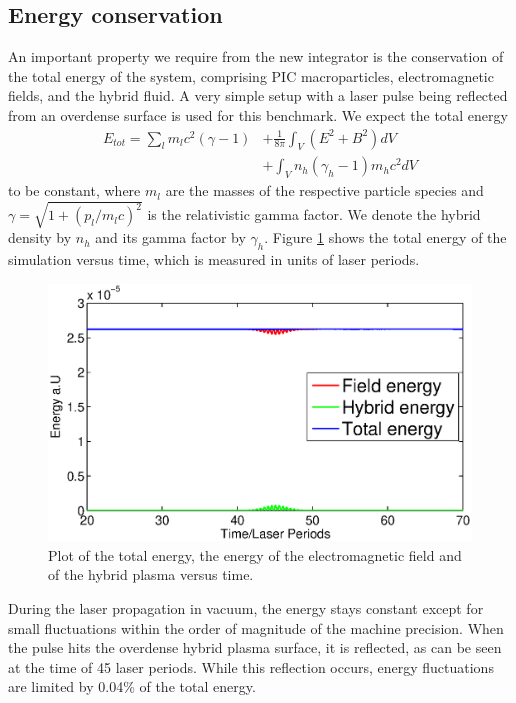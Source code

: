 \documentclass[conference]{IEEEtran}
\renewcommand{\~}{\widetilde }
\begin{document}
\subsection{Energy conservation}
An important property we require from the new integrator is the conservation of the total energy of the system, comprising PIC macroparticles, electromagnetic fields,
and the hybrid fluid. A very simple setup with a laser pulse being reflected from an overdense surface is used for this benchmark. We expect the total energy
\begin{align*}
 E_{tot} =  \sum_l{m_l c^2 (\gamma-1)} &+ \frac{1}{8\pi}\int_V (E^2 + B^2)dV \\
  &+\int_V n_h (\gamma_h -1)m_h c^2 dV
\end{align*}
to be constant, where $m_l$ are the masses of the respective particle species and $\gamma = \sqrt{1 + (p_l/m_lc)^2}$ is the relativistic gamma factor. We denote the hybrid density by $n_h$ and its gamma factor by $\gamma_h$. Figure \ref{energy} shows the total energy of the simulation versus time, which is measured in units of laser periods.
\begin{figure}[H]
	\begin{center}
		\includegraphics[width=1.0\columnwidth]{Energy.eps}
		\caption{Plot of the total energy, the energy of the electromagnetic field and of the hybrid plasma versus time.}
		\label{energy}
	\end{center}
\end{figure}
During the laser propagation in vacuum, the energy stays constant except for small fluctuations within the order of magnitude of the machine precision. When the pulse hits the
overdense hybrid plasma surface, it is reflected, as can be seen at the time of 45 laser periods. While this reflection occurs, energy fluctuations are limited by 0.04\% of
the total energy.
\end{document}
